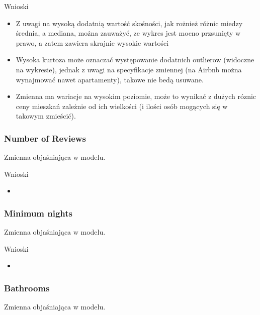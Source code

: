 
Wnioski

\begin{itemize}
    \item Z uwagi na wysoką dodatnią wartość skośności, jak rożnież różnic miedzy średnia, a mediana, można zauważyć, ze wykres jest mocno przsunięty w prawo, a zatem zawiera skrajnie wysokie wartości
    \item Wysoka kurtoza może oznaczać występowanie dodatnich outlierow (widoczne na wykresie), jednak z uwagi na specyfikacje zmiennej (na Airbnb można wynajmować nawet apartamenty), takowe nie bedą usuwane.
    \item Zmienna ma wariacje na wysokim poziomie, może to wynikać z dużych róznic ceny mieszkań zależnie od ich wielkości (i ilości osób mogących się w takowym zmieścić).
\end{itemize}

\subsubsection{Number of Reviews}\label{subsubsec:number-of-reviews}
Zmienna objaśniająca w modelu.



Wnioski

\begin{itemize}
    \item
\end{itemize}

\subsubsection{Minimum nights}\label{subsubsec:minimum-nights}
Zmienna objaśniająca w modelu.



Wnioski

\begin{itemize}
    \item
\end{itemize}

\subsubsection{Bathrooms}\label{subsubsec:bathrooms}
Zmienna objaśniająca w modelu.

